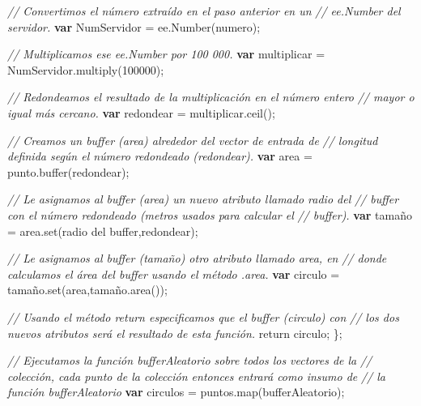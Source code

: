 \documentclass[
  12pt,
  letterpaper,
  twoside]{book}
\newenvironment{Shaded}{\begin{snugshade}}{\end{snugshade}}
\newcommand{\CommentTok}[1]{\textcolor[rgb]{0.24,0.58,0.00}{\textit{#1}}}
\newcommand{\ControlFlowTok}[1]{\textcolor[rgb]{0.00,0.00,0.00}{#1}}
\newcommand{\DecValTok}[1]{\textcolor[rgb]{0.28,0.53,0.93}{#1}}
\newcommand{\FunctionTok}[1]{\textcolor[rgb]{0.48,0.12,0.64}{#1}}
\newcommand{\KeywordTok}[1]{\textcolor[rgb]{0.00,0.00,0.00}{\textbf{#1}}}
\newcommand{\NormalTok}[1]{#1}
\newcommand{\OperatorTok}[1]{\textcolor[rgb]{0.00,0.00,0.00}{#1}}
\newcommand{\StringTok}[1]{\textcolor[rgb]{0.87,0.29,0.22}{#1}}
\begin{document}
\begin{Shaded}
\begin{Highlighting}[]
  \CommentTok{// Convertimos el número extraído en el paso anterior en un }
  \CommentTok{// ee.Number del servidor.}
    \KeywordTok{var}\NormalTok{ NumServidor }\OperatorTok{=}\NormalTok{ ee}\OperatorTok{.}\FunctionTok{Number}\NormalTok{(numero)}\OperatorTok{;}   

  \CommentTok{// Multiplicamos ese ee.Number por 100 000.}
  \KeywordTok{var}\NormalTok{ multiplicar }\OperatorTok{=}\NormalTok{ NumServidor}\OperatorTok{.}\FunctionTok{multiply}\NormalTok{(}\DecValTok{100000}\NormalTok{)}\OperatorTok{;} 
 
  \CommentTok{// Redondeamos el resultado de la multiplicación en el número entero }
  \CommentTok{// mayor o igual más cercano.}
  \KeywordTok{var}\NormalTok{ redondear }\OperatorTok{=}\NormalTok{ multiplicar}\OperatorTok{.}\FunctionTok{ceil}\NormalTok{()}\OperatorTok{;} 
  
  \CommentTok{// Creamos un buffer (area) alrededor del vector de entrada de }
  \CommentTok{// longitud definida según el número redondeado (redondear).}
  \KeywordTok{var}\NormalTok{ area }\OperatorTok{=}\NormalTok{ punto}\OperatorTok{.}\FunctionTok{buffer}\NormalTok{(redondear)}\OperatorTok{;}

  \CommentTok{// Le asignamos al buffer (area) un nuevo atributo llamado \textquotesingle{}radio del}
  \CommentTok{// buffer\textquotesingle{} con el número redondeado (metros usados para calcular el }
  \CommentTok{// buffer).}
  \KeywordTok{var}\NormalTok{ tamaño }\OperatorTok{=}\NormalTok{ area}\OperatorTok{.}\FunctionTok{set}\NormalTok{(}\StringTok{\textquotesingle{}radio del buffer\textquotesingle{}}\OperatorTok{,}\NormalTok{redondear)}\OperatorTok{;}  

  \CommentTok{// Le asignamos al buffer (tamaño) otro atributo llamado \textquotesingle{}area\textquotesingle{}, en }
  \CommentTok{// donde calculamos el área del buffer usando el método .area.}
  \KeywordTok{var}\NormalTok{ circulo }\OperatorTok{=}\NormalTok{ tamaño}\OperatorTok{.}\FunctionTok{set}\NormalTok{(}\StringTok{\textquotesingle{}area\textquotesingle{}}\OperatorTok{,}\NormalTok{tamaño}\OperatorTok{.}\FunctionTok{area}\NormalTok{())}\OperatorTok{;}  

  \CommentTok{// Usando el método return especificamos que el buffer (circulo) con }
  \CommentTok{// los dos nuevos atributos será el resultado de esta función. }
  \ControlFlowTok{return}\NormalTok{ circulo}\OperatorTok{;}
\NormalTok{\}}\OperatorTok{;}

\CommentTok{// Ejecutamos la función \textquotesingle{}bufferAleatorio\textquotesingle{} sobre todos los vectores de la}
\CommentTok{// colección, cada punto de la colección entonces entrará como insumo de }
\CommentTok{// la función bufferAleatorio}
\KeywordTok{var}\NormalTok{ circulos }\OperatorTok{=}\NormalTok{ puntos}\OperatorTok{.}\FunctionTok{map}\NormalTok{(bufferAleatorio)}\OperatorTok{;} 
\end{Highlighting}
\end{Shaded}
\end{document}
